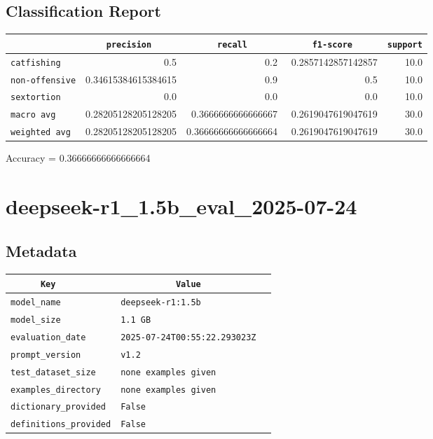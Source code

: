 \documentclass{article}
\begin{document}
\subsection{Classification Report}

\begin{center}
\begin{tabular}{l | r | r | r | r} \hline
    \verb|            | & \verb|    precision     | & \verb|      recall      | & \verb|     f1-score     | & \verb|support| \\ \hline
    \hline
    \verb|catfishing | & 0.5 & 0.2 & 0.2857142857142857 &    10.0 \\ \hline
    \verb|non-offensive| & 0.34615384615384615 & 0.9 & 0.5 &    10.0 \\ \hline
    \verb|sextortion | & 0.0 & 0.0 & 0.0 &    10.0 \\ \hline
    \verb|macro avg  | & 0.28205128205128205 & 0.3666666666666667 & 0.2619047619047619 &    30.0 \\ \hline
    \verb|weighted avg| & 0.28205128205128205 & 0.36666666666666664 & 0.2619047619047619 &    30.0 \\ \hline
\end{tabular}
\end{center}

\begin{center}
Accuracy = 0.36666666666666664
\end{center}

\section{deepseek-r1\_1.5b\_eval\_2025-07-24}
\subsection{Metadata}

\begin{center}
\begin{tabular}{l | l} \hline
    \verb|      Key      | & \verb|           Value           | \\ \hline
    \hline
    \verb|model_name    | & \verb|deepseek-r1:1.5b             | \\ \hline
    \verb|model_size    | & \verb|1.1 GB                       | \\ \hline
    \verb|evaluation_date| & \verb|2025-07-24T00:55:22.293023Z  | \\ \hline
    \verb|prompt_version| & \verb|v1.2                         | \\ \hline
    \verb|test_dataset_size| & \verb|none examples given          | \\ \hline
    \verb|examples_directory| & \verb|none examples given          | \\ \hline
    \verb|dictionary_provided| & \verb|False                        | \\ \hline
    \verb|definitions_provided| & \verb|False                        | \\ \hline
\end{tabular}
\end{center}
\end{document}
